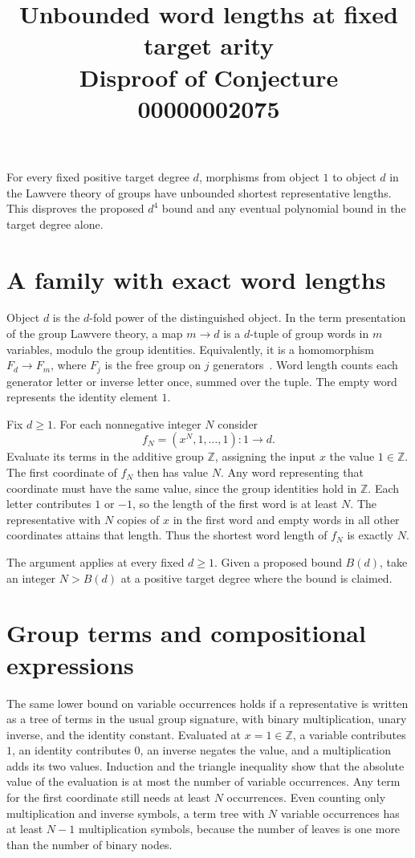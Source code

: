 \documentclass[11pt]{article}
\title{Unbounded word lengths at fixed target arity\\[2pt]\large Disproof of Conjecture 00000002075}
\author{}
\date{}
\begin{document}
\maketitle

\noindent
For every fixed positive target degree $d$, morphisms from object $1$ to
object $d$ in the Lawvere theory of groups have unbounded shortest
representative lengths. This disproves the proposed $d^4$ bound and any
eventual polynomial bound in the target degree alone.

\section*{A family with exact word lengths}

Object $d$ is the $d$-fold power of the distinguished object. In the term
presentation of the group Lawvere theory, a map $m\to d$ is a $d$-tuple
of group words in $m$ variables, modulo the group identities. Equivalently,
it is a homomorphism $F_d\to F_m$, where $F_j$ is the free group on $j$
generators~\cite[p.~869]{lawvere}. Word length counts each generator letter
or inverse letter once, summed over the tuple. The empty
word represents the identity element $1$.

Fix $d\ge1$. For each nonnegative integer $N$ consider
\[
  f_N=(x^N,1,\ldots,1)\colon 1\longrightarrow d.
\]
Evaluate its terms in the additive group $\mathbb Z$, assigning the input
$x$ the value $1\in\mathbb Z$. The first coordinate of $f_N$ then has
value $N$. Any word representing that coordinate must have the same
value, since the group identities hold in $\mathbb Z$. Each letter
contributes $1$ or $-1$, so the length of the first word is at least $N$.
The representative with $N$ copies of $x$ in the first word and empty
words in all other coordinates attains that length. Thus the shortest
word length of $f_N$ is exactly $N$.

The argument applies at every fixed $d\ge1$. Given a proposed bound
$B(d)$, take an integer $N>B(d)$ at a positive target degree where the
bound is claimed.

\section*{Group terms and compositional expressions}

The same lower bound on variable occurrences holds if a representative
is written as a tree of terms in the usual group signature, with binary
multiplication, unary inverse, and the identity constant. Evaluated at
$x=1\in\mathbb Z$, a variable contributes $1$, an identity contributes
$0$, an inverse negates the value, and a multiplication adds its two
values. Induction and the triangle inequality show that the absolute
value of the evaluation is at most the number of variable occurrences.
Any term for the first coordinate still needs at least $N$ occurrences.
Even counting only multiplication and inverse symbols, a term tree with
$N$ variable occurrences has at least $N-1$ multiplication symbols,
because the number of leaves is one more than the number of binary nodes.
\end{document}
